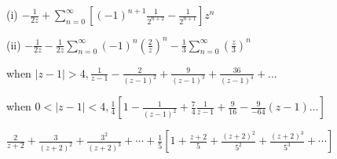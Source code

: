 \begin{Solution}{3.10}
(i) $-\frac{1}{2z}+\sum_{n=0}^{\infty}\left[(-1)^{n+1}\frac{1}{2^{n+2}}-\frac{1}{2^{n+1}}\right]z^{n}$

(ii) $-\frac{1}{2z}-\frac{1}{2z}\sum_{n=0}^{\infty}(-1)^{n}(\frac{2}{z})^{n}-\frac{1}{3}\sum_{n=0}^{\infty}(\frac{z}{3})^{n}$

\end{Solution}
\begin{Solution}{3.11}
when $|z-1|>4,\frac{1}{z-1}-\frac{2}{(z-1)^{2}}+\frac{9}{(z-1)^{3}}+\frac{36}{(z-1)^{4}}+...$

when $0<|z-1|<4,\frac{1}{4}[1-\frac{1}{(z-1)^{2}}+\frac{7}{4}\frac{1}{z-1}+\frac{9}{16}-\frac{9}{-64}(z-1)...]$
\end{Solution}
\begin{Solution}{3.13}
$\frac{2}{z+2}+\frac{3}{(z+2)^{2}}+\frac{3^{2}}{(z+2)^{3}}+\cdots+\frac{1}{5}\left[1+\frac{z+2}{5}+\frac{(z+2)^{2}}{5^{2}}+\frac{(z+2)^{3}}{5^{3}}+\cdots\right]$
\end{Solution}
